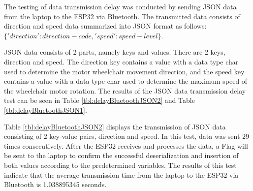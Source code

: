 The testing of data transmission delay was conducted by sending JSON data from the laptop to the ESP32 via Bluetooth. The transmitted data consists of direction and speed data summarized into JSON format as follows: \(\{'direction': direction-code, 'speed': speed-level\}\).

JSON data consists of 2 parts, namely keys and values. There are 2 keys, direction and speed. The direction key contains a value with a data type char used to determine the motor wheelchair movement direction, and the speed key contains a value with a data type char used to determine the maximum speed of the wheelchair motor rotation. The results of the JSON data transmission delay test can be seen in Table \ref{tbl:delayBluetoothJSON2} and Table \ref{tbl:delayBluetoothJSON1}.

Table \ref{tbl:delayBluetoothJSON2} displays the transmission of JSON data consisting of 2 key-value pairs, direction and speed. In this test, data was sent 29 times consecutively. After the ESP32 receives and processes the data, a Flag will be sent to the laptop to confirm the successful deserialization and insertion of both values according to the predetermined variables. The results of this test indicate that the average transmission time from the laptop to the ESP32 via Bluetooth is 1.038895345 seconds.


